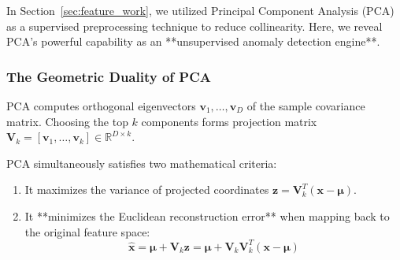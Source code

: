In Section~\ref{sec:feature_work}, we utilized Principal Component Analysis (PCA) as a supervised preprocessing technique to reduce collinearity. Here, we reveal PCA's powerful capability as an **unsupervised anomaly detection engine**.

\subsubsection{The Geometric Duality of PCA}
PCA computes orthogonal eigenvectors $\mathbf{v}_1, \dots, \mathbf{v}_D$ of the sample covariance matrix. Choosing the top $k$ components forms projection matrix $\mathbf{V}_k = [\mathbf{v}_1, \dots, \mathbf{v}_k] \in \mathbb{R}^{D \times k}$.

PCA simultaneously satisfies two mathematical criteria:
\begin{enumerate}
    \item It maximizes the variance of projected coordinates $\mathbf{z} = \mathbf{V}_k^T (\mathbf{x} - \boldsymbol{\mu})$.
    \item It **minimizes the Euclidean reconstruction error** when mapping back to the original feature space:
    \begin{equation}
    \hat{\mathbf{x}} = \boldsymbol{\mu} + \mathbf{V}_k \mathbf{z} = \boldsymbol{\mu} + \mathbf{V}_k \mathbf{V}_k^T (\mathbf{x} - \boldsymbol{\mu})\label{eq:pca_reconstruction_def}
    \end{equation}
\end{enumerate}


